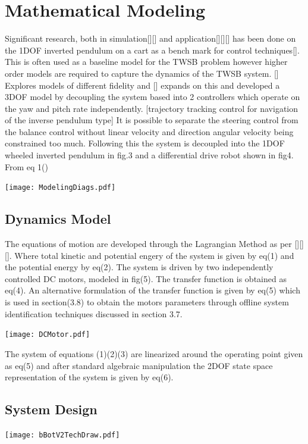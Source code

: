   \section{Mathematical Modeling} %
    Significant research, both in simulation[][] and 
    application[][][] has been done on the 1DOF inverted pendulum
    on a cart as a bench mark for control techniques[]. This is often used as a baseline model for the TWSB problem
    however higher order models are required to capture the dynamics of the TWSB system. [] Explores models of different fidelity 
    and [] expands on this and developed a 3DOF model by decoupling the system based into 2 controllers which 
    operate on the yaw and pitch rate independently. [trajectory tracking control for navigation of the inverse pendulum type] 
    It is possible to separate the steering control from the balance control without linear velocity and direction angular velocity being constrained too much.
    Following this the system is decoupled into the 1DOF wheeled inverted pendulum in fig.3 and a differential drive robot shown in fig4.
    From eq 1()

    \texttt{[image: ModelingDiags.pdf]}
    
    \subsection{Dynamics Model}
    The equations of motion are developed through the Lagrangian Method as per [][][]. 
    Where total kinetic and potential engery of the system is given by eq(1) and the potential energy by eq(2).
    The system is driven by two independently controlled DC motors, modeled in fig(5). The transfer function 
    is obtained as eq(4). An alternative formulation of the transfer function is given by eq(5) which is used in section(3.8) 
    to obtain the motors parameters through offline system identification techniques discussed in section 3.7.

    \texttt{[image: DCMotor.pdf]}

    The system of equations (1)(2)(3) are linearized around the operating point given as eq(5) and after standard algebraic manipulation the 
    2DOF state space representation of the system is given by eq(6).
   
    \pagebreak{}

    \subsection{System Design}
        \texttt{[image: bBotV2TechDraw.pdf]}

